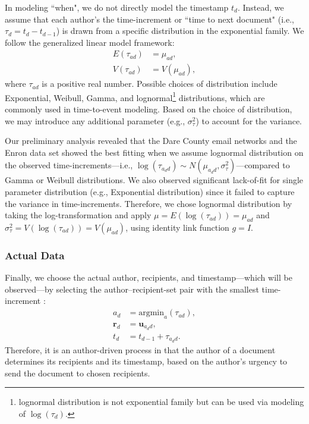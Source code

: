 \documentclass{article}
\begin{document}
In modeling ``when", we do not directly model the timestamp $t_d$. Instead, we assume that each author's the time-increment or ``time to next document" (i.e., $\tau_{d} = t_d-t_{d-1}$) is drawn from a specific distribution in the exponential family.  We follow the generalized linear model framework:
\begin{equation}
\begin{aligned}
E(\tau_{ad}) &= \mu_{ad},\\
V(\tau_{ad}) &= V(\mu_{ad}),
\end{aligned}
\end{equation}
where $\tau_{ad}$ is a positive real number. Possible choices of distribution include Exponential, Weibull, Gamma, and lognormal\footnote{lognormal distribution is not exponential family but can be used via modeling of $\log(\tau_d)$.} distributions, which are commonly used in time-to-event modeling. Based on the choice of distribution, we may introduce any additional parameter (e.g., $\sigma_\tau^2$) to account for the variance.

Our preliminary analysis revealed that the Dare County email networks and the Enron data set showed the best fitting when we assume lognormal distribution on the observed time-increments---i.e., $\log(\tau_{a_dd}) \sim N(\mu_{a_d d}, \sigma^2_\tau)$---compared to Gamma or Weibull distributions. We also observed significant lack-of-fit for single parameter distribution (e.g., Exponential distribution) since it failed to capture the variance in time-increments. Therefore, we chose lognormal distribution by taking the log-transformation and apply $\mu = E(\log(\tau_{ad})) = \mu_{ad}$ and $ \sigma_\tau^2=V(\log(\tau_{ad})) = V(\mu_{ad})$, using identity link function $g = I$. 
\subsubsection{Actual Data}\label{subsubsec:Actual Data}
Finally, we choose the actual author, recipients, and timestamp---which will be observed---by selecting the author--recipient-set pair with the smallest time-increment \cite{snijders1996stochastic}:
\begin{equation}
\begin{aligned}
a_d &= \mbox{argmin}_{a}(\tau_{ad}),\\
\boldsymbol{r}_d &= \boldsymbol{u}_{a_d d},\\
t_d &=t_{d-1} + \tau_{a_d d}.
\end{aligned}
\end{equation}
Therefore, it is an author-driven process in that the author of a document determines its recipients and its timestamp, based on the author's urgency to send the document to chosen recipients. 
\end{document}

